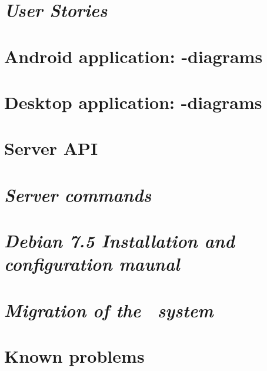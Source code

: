 \begin{appendix}

\chapter{\textit{User Stories}}


\chapter{Android application: -diagrams}


\chapter{Desktop application: -diagrams}
\label{chap:des_appendix}
%

\chapter{Server API}


\chapter{\textit{Server commands}}


%

\chapter{\textit{Debian 7.5 Installation and configuration maunal}}


\chapter{\textit{Migration of the \appName\ system}}


\chapter{Known problems}
\label{chap:knownProblems}


\end{appendix}
